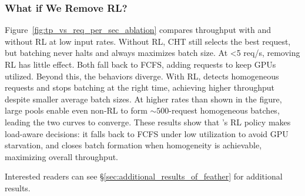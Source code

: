 \vspace{-5pt}

\subsubsection*{What if We Remove RL?}
Figure~\ref{fig:tp_vs_req_per_sec_ablation} compares throughput with and without RL at low input rates. Without RL, CHT still selects the best request, but batching never halts and always maximizes batch size. At <5 req/s, removing RL has little effect. Both fall back to FCFS, adding requests to keep GPUs utilized. Beyond this, the behaviors diverge. With RL, \Feather detects homogeneous requests and stops batching at the right time, achieving higher throughput despite smaller average batch sizes. At higher rates than shown in the figure, large pools enable even non-RL to form ${\sim}500$-request homogeneous batches, leading the two curves to converge. These results show that \Feather's RL policy makes load-aware decisions: it falls back to FCFS under low utilization to avoid GPU starvation, and closes batch formation when homogeneity is achievable, maximizing overall throughput.

Interested readers can see \S\ref{sec:additional_results_of_feather} for additional results.